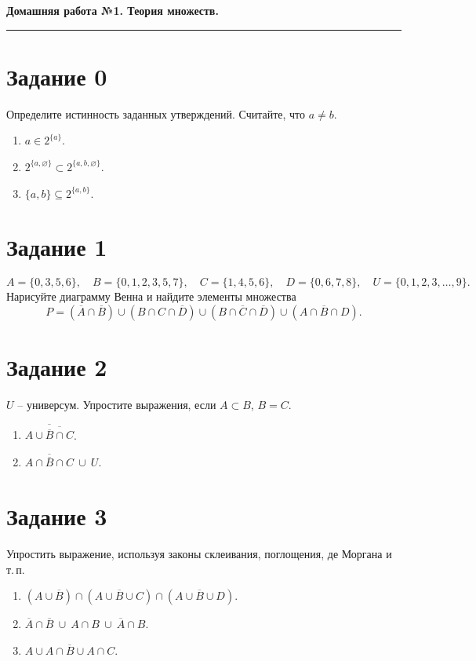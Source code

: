\documentclass[a4paper,12pt,oneside]{article}
\begin{document}
\begin{center}
    {\Large\bfseries Домашняя работа №1. Теория множеств.}\\[2mm]
\end{center}
\vspace{2mm}
\hrule
\vspace{4mm}

\section*{Задание 0}
Определите истинность заданных утверждений. Считайте, что $a \ne b$.
\begin{enumerate}[label=\arabic*.]
\item $a \in 2^{\{a\}}$.
\item $2^{\{a,\varnothing\}} \subset 2^{\{a,b,\varnothing\}}$.
\item $\{a,b\} \subseteq 2^{\{a,b\}}$.
\end{enumerate}

\section*{Задание 1}
\[
A=\{0,3,5,6\},\quad
B=\{0,1,2,3,5,7\},\quad
C=\{1,4,5,6\},\quad
D=\{0,6,7,8\},\quad
U=\{0,1,2,3,\ldots,9\}.
\]
Нарисуйте диаграмму Венна и найдите элементы множества
\[
P=(\overline{A}\cap \overline{B})
\cup (B\cap C\cap \overline{D})
\cup (B\cap \overline{C}\cap \overline{D})
\cup (A\cap \overline{B}\cap D).
\]

\section*{Задание 2}
$U$ – универсум. Упростите выражения, если $A\subset B$, $B=C$.
\begin{enumerate}[label=\arabic*.]
\item $\overline{A\cup \overline{\overline{B}\cap C}}$.
\item $\overline{A\cap \overline{B}\cap C}\ \cup\ U$.
\end{enumerate}

\section*{Задание 3}
Упростить выражение, используя законы склеивания, поглощения, де Моргана и т.\,п.
\begin{enumerate}[label=\arabic*.]
\item $(A\cup \overline{B})\cap (A\cup \overline{B}\cup C)\cap (A\cup \overline{B}\cup D)$.
\item $\overline{A}\cap \overline{B}\ \cup\ A\cap B\ \cup\ \overline{A}\cap B$.
\item $\overline{A\cup A\cap B\cup A\cap C}$.
\end{enumerate}
\end{document}
